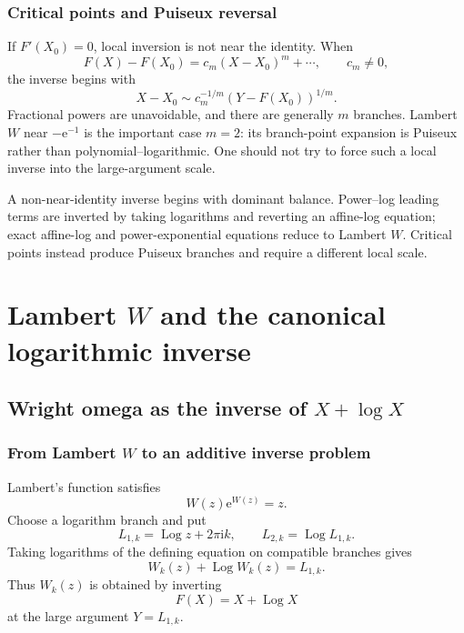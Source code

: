 \documentclass[11pt,oneside]{book}
\theoremstyle{definition}
\theoremstyle{remark}
\DeclareMathOperator{\Log}{Log}
\newcommand{\e}{\mathrm e}
\begin{document}
\section{Critical points and Puiseux reversal}
If $F'(X_0)=0$, local inversion is not near the identity.  When
\[
 F(X)-F(X_0)=c_m(X-X_0)^m+\cdots,
 \qquad c_m\ne0,
\]
the inverse begins with
\[
 X-X_0\sim c_m^{-1/m}(Y-F(X_0))^{1/m}.
\]
Fractional powers are unavoidable, and there are generally $m$ branches.
Lambert $W$ near $-\e^{-1}$ is the important case $m=2$: its branch-point
expansion is Puiseux rather than polynomial--logarithmic.  One should not try
to force such a local inverse into the large-argument scale.

\begin{summarybox}
A non-near-identity inverse begins with dominant balance.  Power--log leading
terms are inverted by taking logarithms and reverting an affine-log equation;
exact affine-log and power-exponential equations reduce to Lambert $W$.
Critical points instead produce Puiseux branches and require a different
local scale.
\end{summarybox}

\part{Lambert \texorpdfstring{$W$}{W} and the canonical logarithmic inverse}
\label{part:lambert}

\chapter{Wright omega as the inverse of \texorpdfstring{$X+\log X$}{X+log X}}
\label{ch:lambert-omega}

\section{From Lambert \texorpdfstring{$W$}{W} to an additive inverse problem}
Lambert's function satisfies
\[
 W(z)\e^{W(z)}=z.
\]
Choose a logarithm branch and put
\begin{equation}\label{eq:L1-L2-def}
 L_{1,k}=\Log z+2\pi\mathrm i k,
 \qquad
 L_{2,k}=\Log L_{1,k}.
\end{equation}
Taking logarithms of the defining equation on compatible branches gives
\begin{equation}\label{eq:W-additive-equation}
 W_k(z)+\Log W_k(z)=L_{1,k}.
\end{equation}
Thus $W_k(z)$ is obtained by inverting
\[
 F(X)=X+\Log X
\]
at the large argument $Y=L_{1,k}$.
\end{document}
